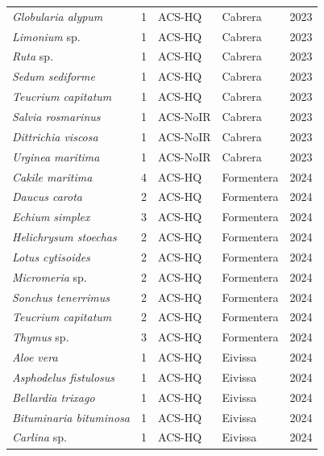 \documentclass[]{article}
\renewcommand{\(}{\left(}
\renewcommand{\)}{\right)}
\renewcommand{\[}{\left[}
\renewcommand{\]}{\right]}
\begin{document}
\begin{longtable}{l r l l r}
    \textit{Globularia alypum}             & 1 & ACS-HQ    & Cabrera    & 2023 \\
    \textit{Limonium} sp.                   & 1 & ACS-HQ    & Cabrera    & 2023 \\
    \textit{Ruta} sp.                       & 1 & ACS-HQ    & Cabrera    & 2023 \\
    \textit{Sedum sediforme}               & 1 & ACS-HQ    & Cabrera    & 2023 \\
    \textit{Teucrium capitatum}            & 1 & ACS-HQ    & Cabrera    & 2023 \\
    \textit{Salvia rosmarinus}             & 1 & ACS-NoIR & Cabrera    & 2023 \\
    \textit{Dittrichia viscosa}            & 1 & ACS-NoIR & Cabrera    & 2023 \\
    \textit{Urginea maritima}              & 1 & ACS-NoIR & Cabrera    & 2023 \\
    \textit{Cakile maritima}               & 4 & ACS-HQ    & Formentera & 2024 \\
    \textit{Daucus carota}                 & 2 & ACS-HQ    & Formentera & 2024 \\
    \textit{Echium simplex}                & 3 & ACS-HQ    & Formentera & 2024 \\
    \textit{Helichrysum stoechas}          & 2 & ACS-HQ    & Formentera & 2024 \\
    \textit{Lotus cytisoides}              & 2 & ACS-HQ    & Formentera & 2024 \\
    \textit{Micromeria} sp.                 & 2 & ACS-HQ    & Formentera & 2024 \\
    \textit{Sonchus tenerrimus}            & 2 & ACS-HQ    & Formentera & 2024 \\
    \textit{Teucrium capitatum}            & 2 & ACS-HQ    & Formentera & 2024 \\
    \textit{Thymus} sp.                    & 3 & ACS-HQ    & Formentera & 2024 \\
    \textit{Aloe vera}                     & 1 & ACS-HQ    & Eivissa    & 2024 \\
    \textit{Asphodelus fistulosus}         & 1 & ACS-HQ    & Eivissa    & 2024 \\
   \textit{ Bellardia trixago}             & 1 & ACS-HQ    & Eivissa    & 2024 \\
    \textit{Bituminaria bituminosa}        & 1 & ACS-HQ    & Eivissa    & 2024 \\
    \textit{Carlina} sp.                   & 1 & ACS-HQ    & Eivissa    & 2024 \\

\end{longtable}
\end{document}
